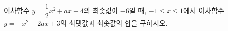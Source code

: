 이차함수 $y=\dfrac{1}{2}x^2+ax-4$의 최솟값이 $-6$일 때, $-1\le x\le 1$에서 이차함수 $y=-x^2+2ax+3$의 최댓값과 최솟값의 합을 구하시오. 
